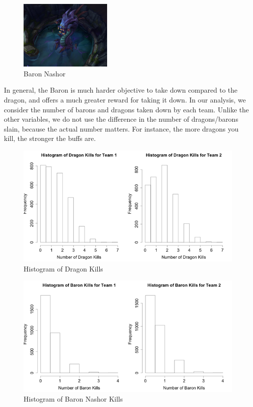 \documentclass[runningheads]{llncs}
\begin{document}
	\begin{figure}
		\centering
		\includegraphics[width=0.4\textwidth]{images/baron.png}
		\caption{Baron Nashor}
	\end{figure}	

	In general, the Baron is much harder objective to take down compared to the dragon, and offers a much greater reward for taking it down. In our analysis, we consider the number of barons and dragons taken down by each team. Unlike the other variables, we do not use the difference in the number of dragons/barons slain, because the actual number matters. For instance, the more dragons you kill, the stronger the buffs are. 

	\begin{figure}[!htb]
		\centering
		\includegraphics[width=\textwidth]{images/hist_dragon.png}
		\caption{Histogram of Dragon Kills}
	\end{figure}	

	\begin{figure}[!htb]
		\centering
		\includegraphics[width=\textwidth]{images/hist_baron.png}
		\caption{Histogram of Baron Nashor Kills}
	\end{figure}
	
\end{document}
